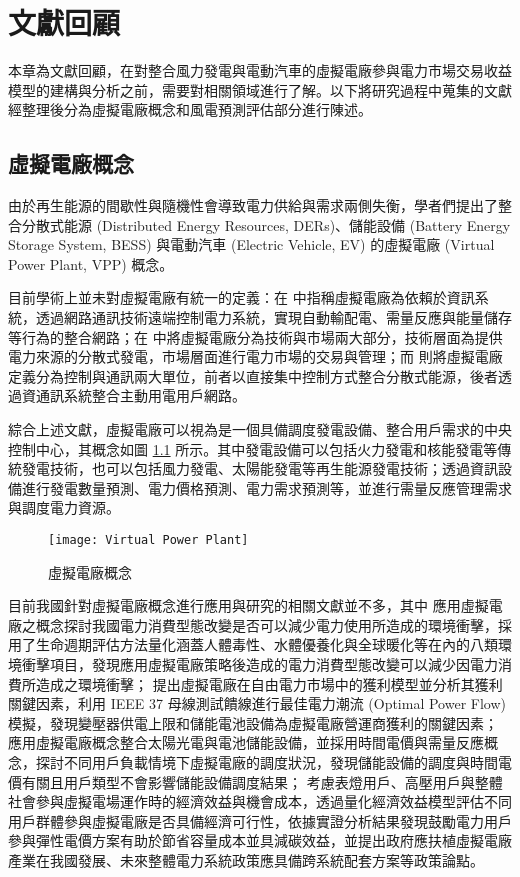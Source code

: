 
\chapter{文獻回顧}

本章為文獻回顧，在對整合風力發電與電動汽車的虛擬電廠參與電力市場交易收益模型的建構與分析之前，需要對相關領域進行了解。以下將研究過程中蒐集的文獻經整理後分為虛擬電廠概念和風電預測評估部分進行陳述。

\section{虛擬電廠概念}

由於再生能源的間歇性與隨機性會導致電力供給與需求兩側失衡，學者們提出了整合分散式能源 (Distributed Energy Resources, DERs)、儲能設備 (Battery Energy Storage System, BESS) 與電動汽車 (Electric Vehicle, EV) 的虛擬電廠 (Virtual Power Plant, VPP) 概念。

目前學術上並未對虛擬電廠有統一的定義：在 \cite{Asmus2010} 中指稱虛擬電廠為依賴於資訊系統，透過網路通訊技術遠端控制電力系統，實現自動輸配電、需量反應與能量儲存等行為的整合網路；在 \cite{Pudjianto2007, Pudjianto2017} 中將虛擬電廠分為技術與市場兩大部分，技術層面為提供電力來源的分散式發電，市場層面進行電力市場的交易與管理；而 \cite{braun2008review} 則將虛擬電廠定義分為控制與通訊兩大單位，前者以直接集中控制方式整合分散式能源，後者透過資通訊系統整合主動用電用戶網路。

綜合上述文獻，虛擬電廠可以視為是一個具備調度發電設備、整合用戶需求的中央控制中心，其概念如圖 \ref{figure: Virtual Power Plant} 所示。其中發電設備可以包括火力發電和核能發電等傳統發電技術，也可以包括風力發電、太陽能發電等再生能源發電技術；透過資訊設備進行發電數量預測、電力價格預測、電力需求預測等，並進行需量反應管理需求與調度電力資源。

\begin{figure}[htbp]
  \centering
  \texttt{[image: Virtual Power Plant]}
  \caption{虛擬電廠概念}
  \label{figure: Virtual Power Plant}
\end{figure}

目前我國針對虛擬電廠概念進行應用與研究的相關文獻並不多，其中 \cite{U0001-2906201000281800} 應用虛擬電廠之概念探討我國電力消費型態改變是否可以減少電力使用所造成的環境衝擊，採用了生命週期評估方法量化涵蓋人體毒性、水體優養化與全球暖化等在內的八類環境衝擊項目，發現應用虛擬電廠策略後造成的電力消費型態改變可以減少因電力消費所造成之環境衝擊；\cite{U0027-0212201417510382} 提出虛擬電廠在自由電力市場中的獲利模型並分析其獲利關鍵因素，利用 IEEE 37 母線測試饋線進行最佳電力潮流 (Optimal Power Flow) 模擬，發現變壓器供電上限和儲能電池設備為虛擬電廠營運商獲利的關鍵因素；\cite{U0027-2501201611000959} 應用虛擬電廠概念整合太陽光電與電池儲能設備，並採用時間電價與需量反應概念，探討不同用戶負載情境下虛擬電廠的調度狀況，發現儲能設備的調度與時間電價有關且用戶類型不會影響儲能設備調度結果；\cite{chung2016vpp} 考慮表燈用戶、高壓用戶與整體社會參與虛擬電場運作時的經濟效益與機會成本，透過量化經濟效益模型評估不同用戶群體參與虛擬電廠是否具備經濟可行性，依據實證分析結果發現鼓勵電力用戶參與彈性電價方案有助於節省容量成本並具減碳效益，並提出政府應扶植虛擬電廠產業在我國發展、未來整體電力系統政策應具備跨系統配套方案等政策論點。

